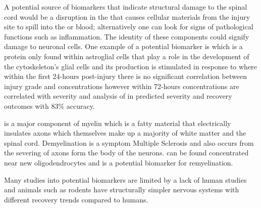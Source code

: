 A potential source of biomarkers that indicate structural damage to the spinal cord would be a disruption in the \bscb that causes cellular materials from the injury site to spill into the \csf or blood; alternatively one can look for signs of pathological functions such as inflammation. The identity of these components could signify damage to neuronal cells. One example of a potential biomarker is \gfap which is a protein only found within astroglial cells that play a role in the development of the cytoskeleton's glial cells and its production is stimulated in response to \sci where within the first 24-hours post-injury there is no significant correlation between injury grade and \gfap concentrations \cite{pouw2014structural} however within 72-hours \gfap concentrations are correlated with severity \cite{kwon2010cerebrospinal, ahadi2015diagnostic} and analysis of \gfap in \csf predicted \sci severity and recovery outcomes with 83\% accuracy. \cite{kwon2017cerebrospinal}

\mbp is a major component of myelin which is a fatty material that electrically insulates axons which themselves make up a majority of white matter and the spinal cord. Demyelination is a symptom Multiple Sclerosis and also occurs from the severing of axons form the body of the neurons. \mbp can be found concentrated near new oligodendrocytes and is a potential biomarker for remyelination. \cite{hesp2015chronic, zhang2011neurological}
\fi



Many studies into potential biomarkers are limited by a lack of human studies \cite{badhiwala2018review} and animals such as rodents have structurally simpler nervous systems with different recovery trends compared to humans. \cite{courtine2007can}
\fi

